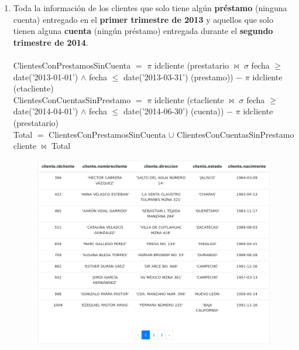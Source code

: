 \documentclass{exam}
\begin{document}
\begin{questions}
\begin{enumerate}[label=\alph*.]
		
		\newpage
		\item Toda la información de los clientes que solo tiene algún \textbf{préstamo} (ninguna cuenta) entregado en el \textbf{primer trimestre de 2013} y aquellos que solo tienen alguna \textbf{cuenta} (ningún préstamo) entregada durante el \textbf{segundo trimestre de 2014}.\\\\
		ClientesConPrestamosSinCuenta $=$ $\pi$ idcliente (prestatario $\bowtie$ $\sigma$ fecha $\geqslant$ date('2013-01-01') $\wedge$ fecha $\leqslant$ date('2013-03-31') (prestamo)) $-$ $\pi$ idcliente (ctacliente)\\
		ClientesConCuentasSinPrestamo $=$  $\pi$ idcliente (ctacliente $\bowtie$ $\sigma$ fecha $\geqslant$ date('2014-04-01') $\wedge$ fecha $\leqslant$ date('2014-06-30') (cuenta)) $-$ $\pi$ idcliente (prestatario)\\
		Total $=$ ClientesConPrestamosSinCuenta $\cup$ ClientesConCuentasSinPrestamo\\
		cliente $\bowtie$ Total\\
		\begin{center}
		\begin{figure}[h!]
			\includegraphics[width=17cm]{imgs/2e.png}
			\centering
		\end{figure}	
		\end{center}
		

\end{enumerate}
\end{questions}
\end{document}
